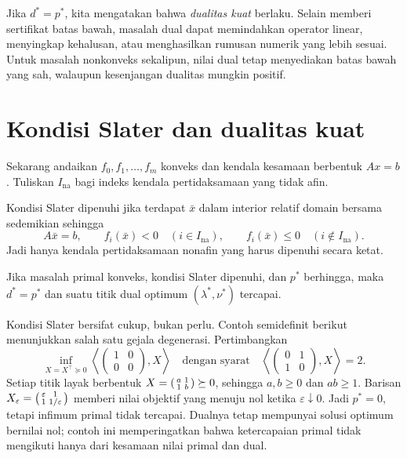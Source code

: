 Jika $d^*=p^*$, kita mengatakan bahwa \emph{dualitas kuat} berlaku. Selain
memberi sertifikat batas bawah, masalah dual dapat memindahkan operator linear,
menyingkap kehalusan, atau menghasilkan rumusan numerik yang lebih sesuai.
Untuk masalah nonkonveks sekalipun, nilai dual tetap menyediakan batas bawah
yang sah, walaupun kesenjangan dualitas mungkin positif.

\section{Kondisi Slater dan dualitas kuat}

Sekarang andaikan $f_0,f_1,\ldots,f_m$ konveks dan kendala kesamaan berbentuk
$Ax=b$. Tuliskan $I_{\mathrm{na}}$ bagi indeks kendala pertidaksamaan yang tidak
afin.

\begin{defn}
  Kondisi Slater dipenuhi jika terdapat $\bar x$ dalam interior relatif domain
  bersama sedemikian sehingga
  \begin{equation}
    A\bar x=b,\qquad
    f_i(\bar x)<0\quad(i\in I_{\mathrm{na}}),\qquad
    f_i(\bar x)\leq0\quad(i\notin I_{\mathrm{na}}).
  \end{equation}
  Jadi hanya kendala pertidaksamaan nonafin yang harus dipenuhi secara ketat.
\end{defn}

\begin{theorem}[Slater]
  Jika masalah primal konveks, kondisi Slater dipenuhi, dan $p^*$ berhingga,
  maka $d^*=p^*$ dan suatu titik dual optimum $(\lambda^*,\nu^*)$ tercapai.
\end{theorem}

Kondisi Slater bersifat cukup, bukan perlu. Contoh semidefinit berikut
menunjukkan salah satu gejala degenerasi. Pertimbangkan
\begin{equation}
  \inf_{X=X^\top\succeq0}
  \left\langle
    \begin{pmatrix}1&0\\0&0\end{pmatrix},X
  \right\rangle
  \quad\text{dengan syarat}\quad
  \left\langle
    \begin{pmatrix}0&1\\1&0\end{pmatrix},X
  \right\rangle=2.
\end{equation}
Setiap titik layak berbentuk
$X=\begin{psmallmatrix}a&1\\1&b\end{psmallmatrix}\succeq0$, sehingga
$a,b\geq0$ dan $ab\geq1$. Barisan
$X_\varepsilon=\begin{psmallmatrix}\varepsilon&1\\1&1/\varepsilon\end{psmallmatrix}$
memberi nilai objektif yang menuju nol ketika $\varepsilon\downarrow0$.
Jadi $p^*=0$, tetapi infimum primal tidak tercapai. Dualnya tetap mempunyai
solusi optimum bernilai nol; contoh ini memperingatkan bahwa ketercapaian
primal tidak mengikuti hanya dari kesamaan nilai primal dan dual.

